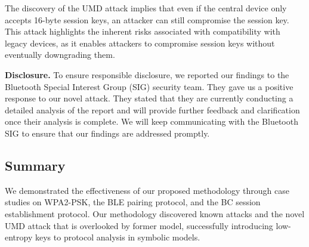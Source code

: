 \documentclass[../main.tex]{subfiles}  %
\begin{document}
The discovery of the UMD attack implies that even if the central device only accepts 16-byte session keys, an attacker can still compromise the session key.
This attack highlights the inherent risks associated with compatibility with legacy devices, as it enables attackers to compromise session keys without eventually downgrading them.

\noindent
\textbf{Disclosure.}
To ensure responsible disclosure, we reported our findings to the Bluetooth Special Interest Group (SIG) security team.
They gave us a positive response to our novel attack. 
They stated that they are currently conducting a detailed analysis of the report and will provide further feedback and clarification once their analysis is complete.
We will keep communicating with the Bluetooth SIG to ensure that our findings are addressed promptly.

\subsection{Summary}

We demonstrated the effectiveness of our proposed methodology through case studies on WPA2-PSK, the BLE pairing protocol, and the BC session establishment protocol. 
Our methodology discovered known attacks and the novel UMD attack that is overlooked by former model, successfully introducing low-entropy keys to protocol analysis in symbolic models. 
\end{document}
